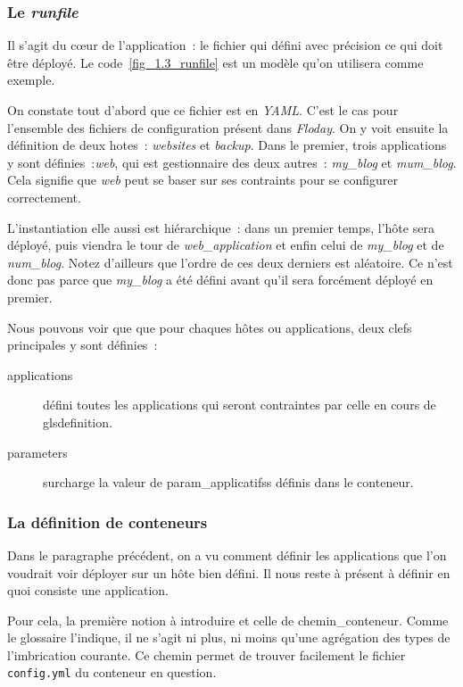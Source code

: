 \subsubsection{Le \emph{runfile}}



Il s'agit du cœur de l'application~: le fichier qui défini avec précision ce qui doit être déployé.
Le code~\ref{fig_1.3_runfile} est un modèle qu'on utilisera comme exemple.

On constate tout d'abord que ce fichier est en \emph{YAML}.
C'est le cas pour l'ensemble des fichiers de configuration présent dans \emph{Floday}.
On y voit ensuite la définition de deux \glspl{hote}~: \emph{websites} et \emph{backup}.
Dans le premier, trois \glspl{application} y sont définies~:\emph{web}, qui est \gls{gestionnaire} des deux autres~: \emph{my\_blog} et \emph{mum\_blog}.
Cela signifie que \emph{web} peut se baser sur ses \glspl{contraint} pour se configurer correctement.

L'\gls{instantiation} elle aussi est hiérarchique~: dans un premier temps, l'hôte sera déployé, puis viendra le tour de \emph{web\_application} et enfin celui de \emph{my\_blog} et de \emph{num\_blog}.
Notez d'ailleurs que l'ordre de ces deux derniers est aléatoire.
Ce n'est donc pas parce que \emph{my\_blog} a été défini avant qu'il sera forcément déployé en premier.

Nous pouvons voir que que pour chaques hôtes ou applications, deux clefs principales  y sont définies~:
\begin{description}
	\item[applications] défini toutes les applications qui seront contraintes par celle en cours de gls{definition}.
	\item[parameters] surcharge la valeur de \glspl{param_applicatifs} définis dans le conteneur.
\end{description}

\subsubsection{La définition de conteneurs}

Dans le paragraphe précédent, on a vu comment définir les \glspl{application} que l'on voudrait voir déployer sur un hôte bien défini.
Il nous reste à présent à définir en quoi consiste une application.

Pour cela, la première notion à introduire et celle de \gls{chemin_conteneur}.
Comme le glossaire l'indique, il ne s'agit ni plus, ni moins qu'une agrégation des types de l'\gls{imbrication} courante.
Ce chemin permet de trouver facilement le fichier {\tt config.yml} du conteneur en question.

